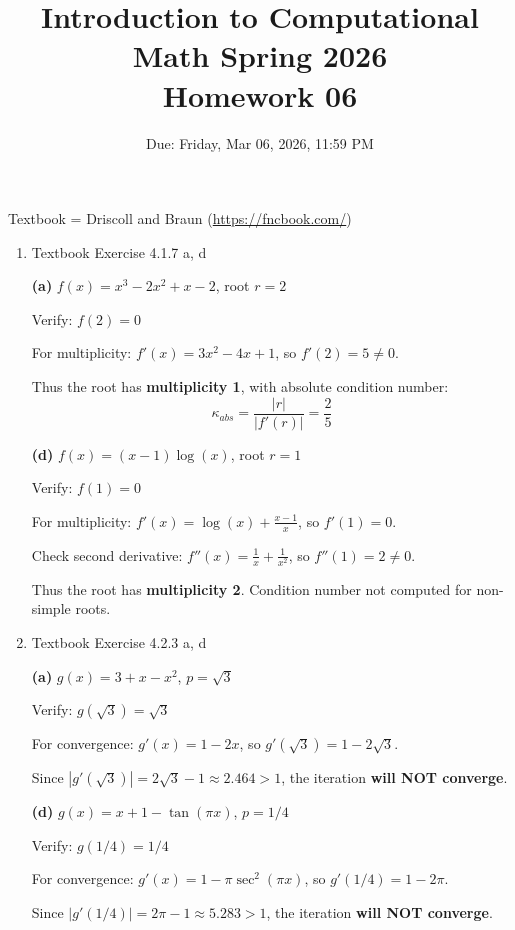\documentclass[reqno, answers]{exam}
\title{Introduction to Computational Math Spring 2026 \\ Homework 06}
\date{Due: Friday, Mar 06, 2026, 11:59 PM}
\author{}
\begin{document}
\maketitle
\thispagestyle{empty}

Textbook = Driscoll and Braun (\url{https://fncbook.com/})

\begin{enumerate}

\item Textbook Exercise 4.1.7 a, d
\begin{solution}
\textbf{(a)} $f(x) = x^3 - 2x^2 + x - 2$, root $r = 2$

Verify: $f(2) = 0$ \checkmark

For multiplicity: $f'(x) = 3x^2 - 4x + 1$, so $f'(2) = 5 \neq 0$.

Thus the root has \textbf{multiplicity 1}, with absolute condition number:
$$\kappa_{abs} = \frac{|r|}{|f'(r)|} = \frac{2}{5}$$

\textbf{(d)} $f(x) = (x-1)\log(x)$, root $r = 1$

Verify: $f(1) = 0$ \checkmark

For multiplicity: $f'(x) = \log(x) + \frac{x-1}{x}$, so $f'(1) = 0$.

Check second derivative: $f''(x) = \frac{1}{x} + \frac{1}{x^2}$, so $f''(1) = 2 \neq 0$.

Thus the root has \textbf{multiplicity 2}. Condition number not computed for non-simple roots.
\end{solution}

\item Textbook Exercise 4.2.3 a, d
\begin{solution}
\textbf{(a)} $g(x) = 3 + x - x^2$, $p = \sqrt{3}$

Verify: $g(\sqrt{3}) = \sqrt{3}$ \checkmark

For convergence: $g'(x) = 1 - 2x$, so $g'(\sqrt{3}) = 1 - 2\sqrt{3}$.

Since $|g'(\sqrt{3})| = 2\sqrt{3} - 1 \approx 2.464 > 1$, the iteration \textbf{will NOT converge}.

\textbf{(d)} $g(x) = x + 1 - \tan(\pi x)$, $p = 1/4$

Verify: $g(1/4) = 1/4$ \checkmark

For convergence: $g'(x) = 1 - \pi \sec^2(\pi x)$, so $g'(1/4) = 1 - 2\pi$.

Since $|g'(1/4)| = 2\pi - 1 \approx 5.283 > 1$, the iteration \textbf{will NOT converge}.
\end{solution}


\end{enumerate}
\end{document}
